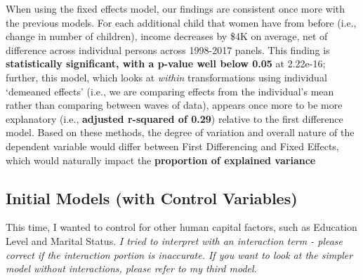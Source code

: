 \documentclass[
]{article}
\begin{document}
When using the fixed effects model, our findings are consistent once
more with the previous models. For each additional child that women have
from before (i.e., change in number of children), income decreases by
\$4K on average, net of difference across individual persons across
1998-2017 panels. This finding is \textbf{statistically significant,
with a p-value well below 0.05} at 2.22e-16; further, this model, which
looks at \emph{within} transformations using individual `demeaned
effects' (i.e., we are comparing effects from the individual's mean
rather than comparing between waves of data), appears once more to be
more explanatory (i.e., \textbf{adjusted r-squared of 0.29}) relative to
the first difference model. Based on these methods, the degree of
variation and overall nature of the dependent variable would differ
between First Differencing and Fixed Effects, which would naturally
impact the \textbf{proportion of explained variance}

\hypertarget{initial-models-with-control-variables}{%
\subsection{Initial Models (with Control
Variables)}\label{initial-models-with-control-variables}}

This time, I wanted to control for other human capital factors, such as
Education Level and Marital Status. \emph{I tried to interpret with an
interaction term - please correct if the interaction portion is
inaccurate. If you want to look at the simpler model without
interactions, please refer to my third model.}
\end{document}

